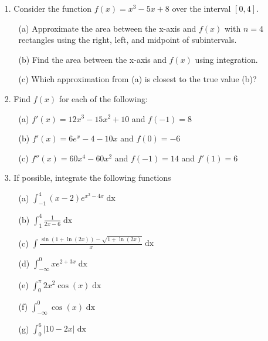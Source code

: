 \documentclass[12pt, amssymb, one column]{article}
\begin{document}
\begin{itemize}
	\item[1.] Consider the function $f(x) = x^3 - 5x+8$ over the interval $[0,4]$.
		\begin{itemize}
			\item[(a)] Approximate the area between the x-axis and $f(x)$ with $n=4$ rectangles using the right, left, and midpoint of subintervals.
			\item[(b)] Find the area between the x-axis and $f(x)$ using integration.
			\item[(c)] Which approximation from (a) is closest to the true value (b)?
		\end{itemize}
	
	\item[2.] Find $f(x)$ for each of the following:
		\begin{itemize}
			\item[(a)] $f'(x) = 12x^3 -15x^2 + 10$ and $f(-1) = 8$
			\item[(b)] $f'(x) = 6e^x-4-10x$ and $f(0)=-6$
			\item[(c)] $f''(x) = 60x^4-60x^2$ and $f(-1)=14$ and $f'(1)=6$
		\end{itemize}
	
	\item[3.] If possible, integrate the following functions
		\begin{itemize}
			\item[(a)]$\int_{-1}^4 (x-2)e^{x^2-4x} \mathop{dx}$
			\item[(b)]$\int_1^4 \frac{1}{2x-6} \mathop{dx}$
			\item[(c)]$\int \frac{\sin(1+\ln(2x)) - \sqrt{1+\ln(2x)}}{x} \mathop{dx}$
			\item[(d)]$\int_{-\infty}^0 x e^{2+3x} \mathop{dx}$
			\item[(e)]$\int_0^\pi 2x^2 \cos(x) \mathop{dx}$
			\item[(f)]$\int_{-\infty}^0 \cos(x) \mathop{dx}$
			\item[(g)]$\int_0^6 |10-2x| \mathop{dx}$
		\end{itemize}
	
\end{itemize}
\end{document}
